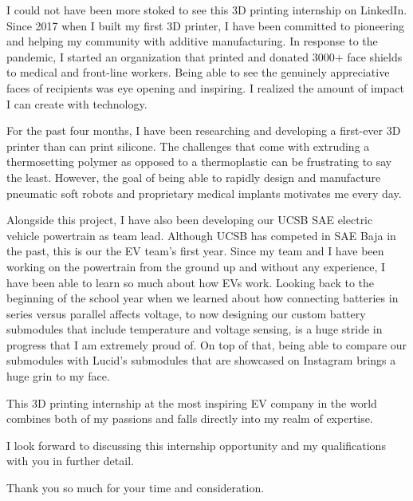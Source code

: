 \documentclass[11pt, letterpaper]{awesome-cv} %
\begin{document}
\makecvheader %

\makelettertitle %


\begin{cvletter}


I could not have been more stoked to see this 3D printing internship on LinkedIn. Since 2017 when I built my first 3D printer, I have been committed to pioneering and helping my community with additive manufacturing. In response to the pandemic, I started an organization that printed and donated 3000+ face shields to medical and front-line workers. Being able to see the genuinely appreciative faces of recipients was eye opening and inspiring. I realized the amount of impact I can create with technology.

For the past four months, I have been researching and developing a first-ever 3D printer than can print silicone. The challenges that come with extruding a thermosetting polymer as opposed to a thermoplastic can be frustrating to say the least. However, the goal of being able to rapidly design and manufacture pneumatic soft robots and proprietary medical implants motivates me every day.

Alongside this project, I have also been developing our UCSB SAE electric vehicle powertrain as team lead. Although UCSB has competed in SAE Baja in the past, this is our the EV team's first year. Since my team and I have been working on the powertrain from the ground up and without any experience, I have been able to learn so much about how EVs work. Looking back to the beginning of the school year when we learned about how connecting batteries in series versus parallel affects voltage, to now designing our custom battery submodules that include temperature and voltage sensing, is a huge stride in progress that I am extremely proud of. On top of that, being able to compare our submodules with Lucid's submodules that are showcased on Instagram brings a huge grin to my face. 



This 3D printing internship at the most inspiring EV company in the world combines both of my passions and falls directly into my realm of expertise. 

I look forward to discussing this internship opportunity and my qualifications with you in further detail.

Thank you so much for your time and consideration.


\end{cvletter}


\makeletterclosing %
\end{document}
